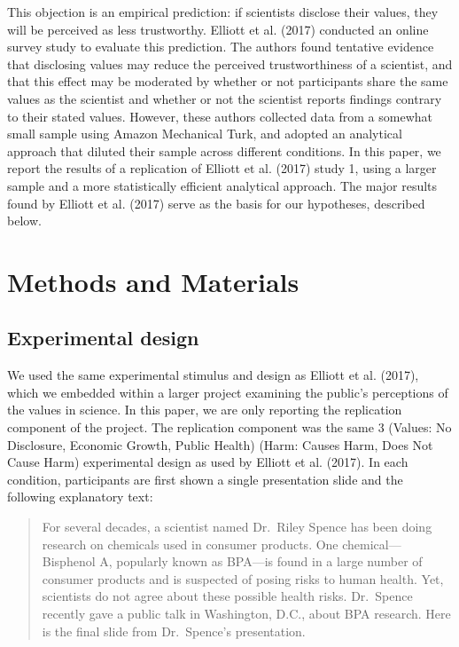 \documentclass[
  letterpaper,
  DIV=11,
  numbers=noendperiod]{scrartcl}
\begin{document}
This objection is an empirical prediction: if scientists disclose their
values, they will be perceived as less trustworthy. Elliott et al.
(2017) conducted an online survey study to evaluate this prediction. The
authors found tentative evidence that disclosing values may reduce the
perceived trustworthiness of a scientist, and that this effect may be
moderated by whether or not participants share the same values as the
scientist and whether or not the scientist reports findings contrary to
their stated values. However, these authors collected data from a
somewhat small sample using Amazon Mechanical Turk, and adopted an
analytical approach that diluted their sample across different
conditions. In this paper, we report the results of a replication of
Elliott et al. (2017) study 1, using a larger sample and a more
statistically efficient analytical approach. The major results found by
Elliott et al. (2017) serve as the basis for our hypotheses, described
below.

\hypertarget{methods-and-materials}{%
\section{Methods and Materials}\label{methods-and-materials}}

\hypertarget{experimental-design}{%
\subsection{Experimental design}\label{experimental-design}}

We used the same experimental stimulus and design as Elliott et al.
(2017), which we embedded within a larger project examining the public's
perceptions of the values in science. In this paper, we are only
reporting the replication component of the project. The replication
component was the same 3 (Values: No Disclosure, Economic Growth, Public
Health)  (Harm: Causes Harm, Does Not Cause Harm) experimental
design as used by Elliott et al. (2017). In each condition, participants
are first shown a single presentation slide and the following
explanatory text:

\begin{quote}
For several decades, a scientist named Dr.~Riley Spence has been doing
research on chemicals used in consumer products. One
chemical---Bisphenol A, popularly known as BPA---is found in a large
number of consumer products and is suspected of posing risks to human
health. Yet, scientists do not agree about these possible health risks.
Dr.~Spence recently gave a public talk in Washington, D.C., about BPA
research. Here is the final slide from Dr.~Spence's presentation.
\end{quote}
\end{document}
